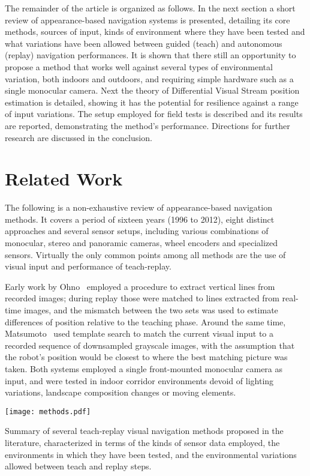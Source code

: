 \documentclass[twocolumn, 9pt,fleqn]{jsproceedings}
\begin{document}
The remainder of the article is organized as follows. In the next section a short review of appearance-based navigation systems is presented, detailing its core methods, sources of input, kinds of environment where they have been tested and what variations have been allowed between guided (teach) and autonomous (replay) navigation performances. It is shown that there still an opportunity to propose a method that works well against several types of environmental variation, both indoors and outdoors, and requiring simple hardware such as a single monocular camera. Next the theory of Differential Visual Stream position estimation is detailed, showing it has the potential for resilience against a range of input variations. The setup employed for field tests is described and its results are reported, demonstrating the method's performance. Directions for further research are discussed in the conclusion.

\section{Related Work}

The following is a non-exhaustive review of appearance-based navigation methods. It covers a period of sixteen years (1996 to 2012), eight distinct approaches and several sensor setups, including various combinations of monocular, stereo and panoramic cameras, wheel encoders and specialized sensors. Virtually the only common points among all methods are the use of visual input and performance of teach-replay.

Early work by Ohno~\cite{OYA96} employed a procedure to extract vertical lines from recorded images; during replay those were matched to lines extracted from real-time images, and the mismatch between the two sets was used to estimate differences of position relative to the teaching phase. Around the same time, Matsumoto~\cite{MAT96} used template search to match the current visual input to a recorded sequence of downsampled grayscale images, with the assumption that the robot's position would be closest to where the best matching picture was taken. Both systems employed a single front-mounted monocular camera as input, and were tested in indoor corridor environments devoid of lighting variations, landscape composition changes or moving elements.

\begin{table}[h!]
\centering
\texttt{[image: methods.pdf]}
\caption{Summary of several teach-replay visual navigation methods proposed in the literature, characterized in terms of the kinds of sensor data employed, the environments in which they have been tested, and the environmental variations allowed between teach and replay steps.}
\label{tab:methods}
\end{table}
\end{document}
